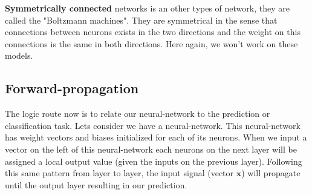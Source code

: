 		\textbf{Symmetrically connected} networks is an other types of network, they are called the "Boltzmann machines". They are symmetrical in the sense that connections between neurons exists in the two directions and the weight on this connections is the same in both directions. Here again, we won't work on these models.


	\subsection{Forward-propagation}
	\label{sec:forward_propagation}
		The logic route now is to relate our neural-network to the prediction or classification task. Lets consider we have a neural-network. This neural-network has weight vectors and biases initialized for each of its neurons. When we input a vector on the left of this neural-network each neurons on the next layer will be assigned a local output value (given the inputs on the previous layer). Following this same pattern from layer to layer, the input signal (vector $\boldsymbol{x}$) will propagate until the output layer resulting in our prediction.

